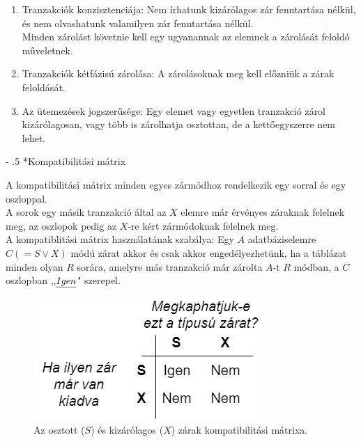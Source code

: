 \documentclass[12pt,margin=0px]{article}
\makeatletter
\renewcommand\paragraph{%
	\@startsection{paragraph}{4}{0mm}%
	{-\baselineskip}%
	{.5\baselineskip}%
	{\normalfont\normalsize\bfseries}}
\makeatother
\begin{document}
    \begin{enumerate}
        \item Tranzakciók konzisztenciája: Nem írhatunk kizárólagos zár fenntartása nélkül, és nem olvashatunk valamilyen zár fenntartása nélkül.\\
        Minden zárolást követnie kell egy ugyanannak az elemnek a zárolását feloldó műveletnek.
        \item Tranzakciók kétfázisú zárolása: A zárolásoknak meg kell előzniük a zárak feloldását.
        \item Az ütemezések jogszerűsége: Egy elemet vagy egyetlen tranzakció zárol kizárólagosan, vagy több is zárolhatja osztottan, de a kettőegyszerre nem lehet.
    \end{enumerate}

	\paragraph*{Kompatibilitási mátrix}

    A kompatibilitási mátrix minden egyes zármódhoz rendelkezik egy sorral és egy oszloppal.\\

	\noindent A sorok egy másik tranzakció által az $X$ elemre már érvényes záraknak felelnek meg, az oszlopok pedig az $X$-re kért zármódoknak felelnek meg. \\

    \noindent A kompatiblitási mátrix használatának szabálya: Egy $A$ adatbáziselemre $C(=S \vee X)$ módú zárat akkor és csak akkor engedélyezhetünk, ha a táblázat minden olyan $R$ sorára, amelyre más tranzakció már zárolta $A$-t $R$ módban, a $C$ oszlopban ,,$\emph{Igen}$" szerepel.
	
	\begin{figure}[H]
		\centering
		\includegraphics[width=0.40\linewidth]{img/kompmatrix}
		\caption{Az osztott ($S$) és kizárólagos ($X$) zárak kompatibilitási mátrixa.}
		\label{fig:kompmatrix}
	\end{figure}
\end{document}
